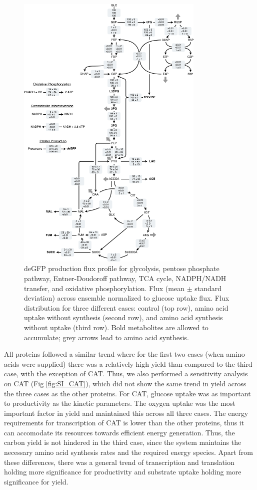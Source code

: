 \documentclass[journal=asbcd6,manuscript=article]{achemso}
\begin{document}
\begin{figure}[h!]
\includegraphics[width=0.8\textwidth]{./Figures/flux.pdf}
\caption{deGFP production flux profile for glycolysis, pentose phosphate pathway, Entner-Doudoroff pathway, TCA cycle, NADPH/NADH transfer, and oxidative phosphorylation. Flux (mean $\pm$ standard deviation) across ensemble normalized to glucose uptake flux. Flux distribution for three different cases: control (top row), amino acid uptake without synthesis (second row), and amino acid synthesis without uptake (third row). Bold metabolites are allowed to accumulate; grey arrows lead to amino acid synthesis.}
\label{fig:flux}
\end{figure}

All proteins followed a similar trend where for the first two cases (when amino acids were supplied) there was a relatively high yield than compared to the third case, with the exception of CAT.
Thus, we also performed a sensitivity analysis on CAT (Fig \ref{fig:SI_CAT}), which did not show the same trend in yield across the three cases as the other proteins.
For CAT, glucose uptake was as important to productivity as the kinetic parameters.
The oxygen uptake was the most important factor in yield and maintained this across all three cases.
The energy requirements for transcription of CAT is lower than the other proteins, thus it can accomodate its resources towards efficient energy generation.
Thus, the carbon yield is not hindered in the third case, since the system maintains the necessary amino acid synthesis rates and the required energy species.
Apart from these differences, there was a general trend of transcription and translation holding more significance for productivity and substrate uptake holding more significance for yield.
\end{document}
